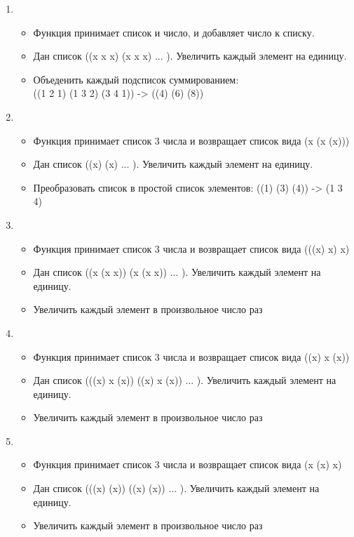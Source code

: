 \documentclass[a4paper,12pt]{article}
\begin{document}
\begin{enumerate}
	\item \begin{itemize}
		\item Функция принимает список и число, и добавляет число к списку.
		\item Дан список ((x x x) (x x x) ... ). Увеличить каждый элемент на единицу.
		\item Объеденить каждый подсписок суммированием:\\ ((1 2 1) (1 3 2) (3 4 1)) -> ((4) (6) (8))
	\end{itemize}

	\item \begin{itemize}
		\item Функция принимает список 3 числа и возвращает список вида (x (x (x)))
		\item Дан список ((x) (x) ... ). Увеличить каждый элемент на единицу.
		\item Преобразовать список в простой список элементов: ((1) (3) (4)) -> (1 3 4)
	\end{itemize}

	\item \begin{itemize}
		\item Функция принимает список 3 числа и возвращает список вида (((x) x) x)
		\item Дан список ((x (x x)) (x (x x)) ... ). Увеличить каждый элемент на единицу.
		\item Увеличить каждый элемент в произвольное число раз
	\end{itemize}

	\item \begin{itemize}
		\item Функция принимает список 3 числа и возвращает список вида ((x) x (x))
		\item Дан список (((x) x (x)) ((x) x (x)) ... ). Увеличить каждый элемент на единицу.
		\item Увеличить каждый элемент в произвольное число раз
	\end{itemize}

	\item \begin{itemize}
		\item Функция принимает список 3 числа и возвращает список вида (x (x) x)
		\item Дан список (((x) (x)) ((x) (x)) ... ). Увеличить каждый элемент на единицу.
		\item Увеличить каждый элемент в произвольное число раз
	\end{itemize}


\end{enumerate}
\end{document}
